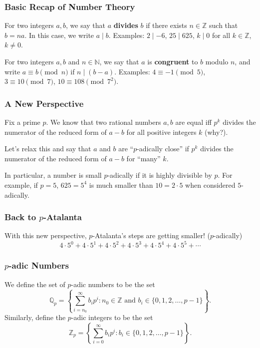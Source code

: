 \documentclass[10pt]{beamer}
\begin{document}
\begin{frame}
    \frametitle{Basic Recap of Number Theory}

    \begin{definition}
        For two integers \(a,b\), we say that \(a\) {\bf divides} \(b\) if there exists \(n\in\mathbb{Z}\) such that \(b=na\).
        In this case, we write \(a\mid b\).
        Examples: \(2\mid -6\), \(25\mid 625\), \(k\mid 0\) for all \(k\in\mathbb{Z}\), \(k\neq 0\).
    \end{definition}

    \begin{definition}
        For two integers \(a,b\) and \(n\in\mathbb{N}\), we say that \(a\) is {\bf congruent} to \(b\) modulo \(n\), and write \(a\equiv b\pmod{n}\) if \(n\mid(b-a)\).
        Examples: \(4\equiv -1\pmod{5}\), \(3\equiv 10\pmod{7}\), \(10\equiv 108\pmod{7^2}\).
    \end{definition}

\end{frame}

\begin{frame}
    \frametitle{A New Perspective}

    Fix a prime \(p\).
    We know that two rational numbers \(a,b\) are equal iff \(p^k\) divides the numerator of the reduced form of \(a-b\) for all positive integers \(k\) (why?).

    Let's relax this and say that \(a\) and \(b\) are ``\(p\)-adically close'' if \(p^k\) divides the numerator of the reduced form of \(a-b\) for ``many'' \(k\).

    In particular, a number is small \(p\)-adically if it is highly divisible by \(p\).
    For example, if \(p=5\), \(625=5^4\) is much smaller than \(10=2\cdot 5\) when considered \(5\)-adically.

\end{frame}

\begin{frame}
    \frametitle{Back to \(p\)-Atalanta}

    With this new perspective, \(p\)-Atalanta's steps are getting smaller! (\(p\)-adically)
    \[4\cdot 5^0 + 4\cdot 5^1 + 4\cdot 5^2 + 4\cdot 5^3 + 4\cdot 5^4 + 4\cdot 5^5 + \cdots\]

\end{frame}

\begin{frame}
    \frametitle{\(p\)-adic Numbers}

    \begin{definition}
        We define the set of \(p\)-adic numbers to be the set
        \[\mathbb{Q}_p = \left\{\sum_{i=n_0}^\infty b_ip^i:n_0\in\mathbb{Z}\text{ and } b_i\in\{0,1,2,\ldots,p-1\}\right\}.\]
        Similarly, define the \(p\)-adic integers to be the set
        \[\mathbb{Z}_p = \left\{\sum_{i=0}^\infty b_ip^i:b_i\in\{0,1,2,\ldots,p-1\}\right\}.\]
    \end{definition}

\end{frame}
\end{document}
